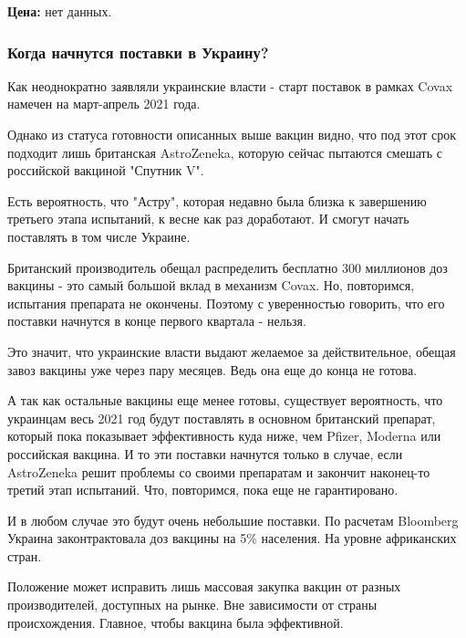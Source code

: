 \textbf{Цена:} нет данных. 

\subsubsection{Когда начнутся поставки в Украину?}

Как неоднократно заявляли украинские власти - старт поставок в рамках Covax
намечен на март-апрель 2021 года. 

Однако из статуса готовности описанных выше вакцин видно, что под этот срок
подходит лишь британская AstroZeneka, которую сейчас пытаются смешать с
российской вакциной "Спутник V".

Есть вероятность, что "Астру", которая недавно была близка к завершению
третьего этапа испытаний, к весне как раз доработают. И смогут начать
поставлять в том числе Украине. 

Британский производитель обещал распределить бесплатно 300 миллионов доз
вакцины - это самый большой вклад в механизм Covax. Но, повторимся, испытания
препарата не окончены. Поэтому с уверенностью говорить, что его поставки
начнутся в конце первого квартала - нельзя. 

Это значит, что украинские власти выдают желаемое за действительное, обещая
завоз вакцины уже через пару месяцев. Ведь она еще до конца не готова. 

А так как остальные вакцины еще менее готовы, существует вероятность, что
украинцам весь 2021 год будут поставлять в основном британский препарат,
который пока показывает эффективность куда ниже, чем Pfizer, Moderna или
российская вакцина. И то эти поставки начнутся только в случае, если
AstroZeneka решит проблемы со своими препаратам и закончит наконец-то третий
этап испытаний. Что, повторимся, пока еще не гарантировано.

И в любом случае это будут очень небольшие поставки. По расчетам Bloomberg
Украина законтрактовала доз вакцины на 5\% населения. На уровне африканских
стран.

Положение может исправить лишь массовая закупка вакцин от разных
производителей, доступных на рынке. Вне зависимости от страны происхождения.
Главное, чтобы вакцина была эффективной.
